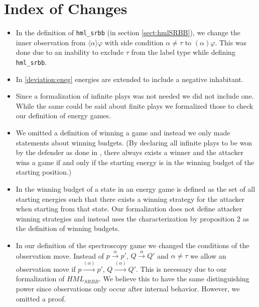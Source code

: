 \section{Index of Changes}
\begin{itemize}
    \item In the definition of \texttt{hml\_srbb} (in section \ref{sect:hmlSRBB}), we change the inner observation from
      $\langle\alpha\rangle\varphi$ with side condition $\alpha \neq \tau$ to $(\alpha)\varphi$.
      This was done due to an inability to exclude $\tau$ from the label type while defining \texttt{hml\_srbb}. 
    
    \item In \ref{deviation:eneg} energies are extended to include a negative inhabitant. 
    
    \item Since a formalization of infinite plays was not needed we did not include one. While the 
    same could be said about finite plays we formalized those to check our definition of energy games.
    
    \item We omitted a definition of winning a game and instead we only made statements about winning budgets. 
    (By declaring all infinite plays to be won by the defender as done in \cite{bisping2023lineartimebranchingtime}, 
    there always exists a winner and the attacker wins a game if and only if the starting energy is in the winning budget of the starting position.)
    
    \item In \cite{bisping2023lineartimebranchingtime} the winning budget of a state in an energy game 
    is defined as the set of all starting energies such that there exists a winning strategy for the attacker 
    when starting from that state. Our formalization does not define attacker winning strategies and instead 
    uses the characterization by proposition 2 \cite[p. 9]{bisping2023lineartimebranchingtime} as the definition of winning budgets.
    
    \item In our definition of the spectroscopy game we changed the conditions of the observation move. 
    Instead of $p \overset{\alpha}{\longrightarrow}p'$, $Q \overset{\alpha}{\longrightarrow} Q'$ and $\alpha \neq \tau$
    we allow an observation move if  $p \overset{(\alpha)}{\longrightarrow}p'$, $Q \overset{(\alpha)}{\longrightarrow} Q'$.
    This is necessary due to our formalization of $HML_{SRBB}$. We believe this to have the same distinguishing power 
    since observations only occur after internal behavior. However, we omitted a proof. 
    

\end{itemize}
